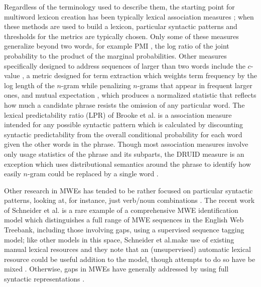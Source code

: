 \documentclass[11pt]{article}
\makeatletter
\def \al {al.\@ }
\makeatother
\begin{document}
Regardless of the terminology used to describe them, the starting point for multiword lexicon creation has been typically lexical association measures \cite{Church90,Schone01,Evert04,Pecina10,DeAraujo11,Kulkarni11}; when these methods are used to build a lexicon, particular syntactic patterns and thresholds for the metrics are typically chosen. Only some of these measures generalize beyond two words, for example PMI \cite{Church90}, the log ratio of the joint probability to the product of the marginal probabilities. Other measures specifically designed to address sequences of larger than two words include the $c$-value \cite{Frantzi00}, a metric designed for term extraction which weights term frequency by the log length of the $n$-gram while penalizing $n$-grams that appear in frequent larger ones, and mutual expectation \cite{Dias99}, which produces a normalized statistic that reflects how much a candidate phrase resists the omission of any particular word. The lexical predictability ratio (LPR) of Brooke et \al \cite{Brooke15b} is a association measure intended for any possible syntactic pattern which is calculated by discounting syntactic predictability from the overall conditional probability for each word given the other words in the phrase. Though most association measures involve only usage statistics of the phrase and its subparts, the DRUID measure is an exception which uses distributional semantics around the phrase to identify how easily $n$-gram could be replaced by a single word \cite{Riedl15}.

Other research in MWEs has tended to be rather focused on particular syntactic patterns, looking at, for instance, just verb/noun combinations \cite{Fazly09}. The recent work of Schneider et \al {} is a rare example of a comprehensive MWE identification model which distinguishes a full range of MWE sequences in the English Web Treebank, including those involving gaps, using a supervised sequence tagging model; like other models in this space, Schneider et \al make use of existing manual lexical resources and they note that an (unsupervised) automatic lexical resource could be useful addition to the model, though attempts to do so have be mixed \cite{Riedl16}. Otherwise, gaps in MWEs have generally addressed by using full syntactic representations \cite{Seretan11}.
\end{document}
